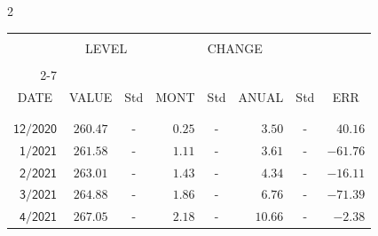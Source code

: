 \begin{multicols}{2}{ 
\begin{tabular}{rccrcrcr} 
\hline 
 \multicolumn{1}{|c|}{}  &  \multicolumn{2}{c|}{} & 
\multicolumn{4}{c}{} & \multicolumn{1}{|c|}{}\vspace{-.10in}\\ 
\multicolumn{1}{|c|}{}  &  \multicolumn{2}{c|}{LEVEL} & 
\multicolumn{4}{c}{CHANGE} & \multicolumn{1}{|c|}{}    \\  
\multicolumn{1}{|c|}{}  &  \multicolumn{2}{c|}{} & 
\multicolumn{4}{c}{} & \multicolumn{1}{|c|}{}\vspace{-.10in}\\ \cline{2-7} 
\multicolumn{1}{|c|}{ } &\multicolumn{1}{c|}{ } & \multicolumn{1}{c|}{} & \multicolumn{1}{c|}{} & \multicolumn{1}{c|}{}     & \multicolumn{1}{c|}{} & \multicolumn{1}{c|}{}  & \multicolumn{1}{c|}{}  \vspace{-.05in}\\  
\multicolumn{1}{|c|}{DATE } &\multicolumn{1}{c|}{ VALUE} & \multicolumn{1}{c|}{Std} & \multicolumn{1}{c|}{MONT} & \multicolumn{1}{c|}{Std}     & \multicolumn{1}{c|}{ANUAL} & \multicolumn{1}{c|}{Std}  & \multicolumn{1}{c|}{ERR}\\  
\multicolumn{1}{|c|}{ }      & \multicolumn{1}{c|}{  }    & \multicolumn{1}{c|}{ }&  \multicolumn{1}{c|}{   }  & \multicolumn{1}{c|}{ } & \multicolumn{1}{c|}{  }     & \multicolumn{1}{c|}{   }  &  \multicolumn{1}{c|}{   } \\  
 \hline 
 \\$\mathsf{      12/2020}$ &$\mathsf{   260.47}$ &     - &$\mathsf{    0.25}$ &     - &$\mathsf{     3.50 }$ &     - &$\mathsf{  40.16} $ \vspace{-.005in}\\ 
$\mathsf{       1/2021}$ &$\mathsf{   261.58}$ &     - &$\mathsf{    1.11}$ &     - &$\mathsf{     3.61 }$ &     - &$\mathsf{ -61.76} $ \vspace{-.005in}\\ 
$\mathsf{       2/2021}$ &$\mathsf{   263.01}$ &     - &$\mathsf{    1.43}$ &     - &$\mathsf{     4.34 }$ &     - &$\mathsf{ -16.11} $ \vspace{-.005in}\\ 
$\mathsf{       3/2021}$ &$\mathsf{   264.88}$ &     - &$\mathsf{    1.86}$ &     - &$\mathsf{     6.76 }$ &     - &$\mathsf{ -71.39} $ \vspace{-.005in}\\ 
$\mathsf{       4/2021}$ &$\mathsf{   267.05}$ &     - &$\mathsf{    2.18}$ &     - &$\mathsf{    10.66 }$ &     - &$\mathsf{  -2.38} $ \vspace{-.005in}\\ 

\end{tabular}}
\end{multicols}

